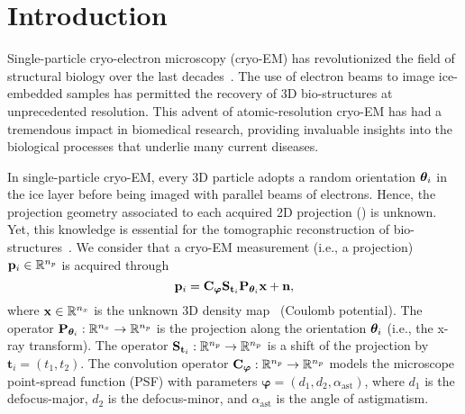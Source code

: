 \section{Introduction}

Single-particle cryo-electron microscopy (cryo-EM) has revolutionized the field of structural biology over the last decades~\cite{dubochet1988cryo, frank2006three, chap0-nat2015MethodYear, 2454550b178143639ce402f1316dfc81}.
The use of electron beams to image ice-embedded samples has permitted the recovery of 3D bio-structures at unprecedented resolution.
This advent of atomic-resolution cryo-EM has had a tremendous impact in biomedical research, providing invaluable insights into the biological processes that underlie many current diseases.

In single-particle cryo-EM, every 3D particle adopts a random orientation ${\boldsymbol{\theta}}_i$ in the ice layer before being imaged with parallel beams of electrons.
Hence, the projection geometry associated to each acquired 2D projection () is unknown.
Yet, this knowledge is essential for the tomographic reconstruction of bio-structures~\cite{Natterer2001mathematics}.
We consider that a cryo-EM measurement (i.e., a projection) $\mathbf{p}_i \in \mathbb{R}^{n_p}$ is acquired through
\begin{equation}
    \label{eqn:imaging-model}
    \mathbf{p}_i = \mathbf{C}_{\boldsymbol\varphi} \mathbf{S}_{\mathbf{t}_i} \mathbf{P}_{{\boldsymbol{\theta}}_i} \mathbf{x} + \mathbf{n},
\end{equation}
where $\mathbf{x} \in \mathbb{R}^{n_x}$ is the unknown 3D density map~\cite{dimaio_creating_2007} (Coulomb potential).
The operator $\mathbf{P}_{{\boldsymbol{\theta}}_i}: \mathbb{R}^{n_x} \to \mathbb{R}^{n_p}$ is the projection along the orientation ${\boldsymbol{\theta}}_i$ (i.e., the x-ray transform).
The operator $\mathbf{S}_{\mathbf{t}_i}: \mathbb{R}^{n_p} \to \mathbb{R}^{n_p}$ is a shift of the projection by $\mathbf{t}_i = (t_1, t_2)$.
The convolution operator $\mathbf{C}_{\boldsymbol\varphi}: \mathbb{R}^{n_p} \to \mathbb{R}^{n_p}$ models the microscope point-spread function (PSF) with parameters $\boldsymbol\varphi = (d_1, d_2, \alpha_\mathrm{ast})$, where $d_1$ is the defocus-major, $d_2$ is the defocus-minor, and $\alpha_\mathrm{ast}$ is the angle of astigmatism.
